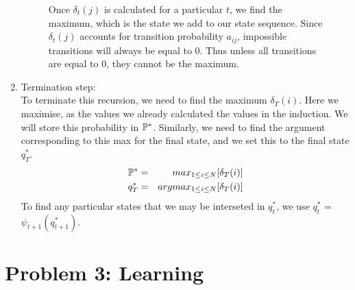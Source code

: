 \begin{enumerate}
\begin{figure}
\begin{center}
                \label{Hidden_Markov:Decoding:Gamma_Lattice}
                \caption{Once $\delta_{t}(j)$ is calculated for a particular $t$, we find the maximum, which is the state we add to our state sequence. Since $\delta_{t}(j)$ accounts for transition probability $a_{ij}$, impossible transitions will always be equal to 0. Thus unless all transitions are equal to 0, they cannot be the maximum.}
            \end{center}
        \end{figure}

        \item Termination step: \\
        To terminate this recursion, we need to find the maximum $\delta_{T}(i)$. Here we maximise, as the values we already calculated the values in the induction. We will store this probability in $\mathbb{P}^*$. Similarly, we need to find the argument corresponding to this max for the final state, and we set this to the final state $q_T^*$.
        \begin{eqnarray}
            \mathbb{P}^* & = & max_{1 \leq i \leq N}[\delta_{T}(i)] \\
            q_T^*   & = & argmax_{1 \leq i \leq N}[\delta_{T}(i)]
        \end{eqnarray}
        To find any particular states that we may be interseted in $q_t^*$, we use $q_t^*$ = $\psi_{t+1}(q_{t+1}^*)$. 
    \end{enumerate}

\section{Problem 3: Learning}
\label{Hidden_Markov:Learning}


